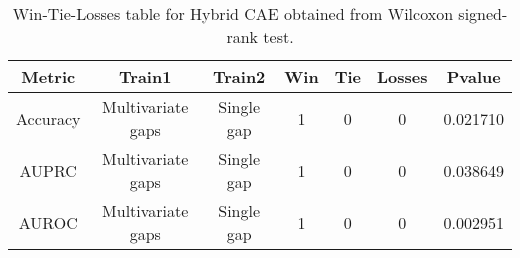 \begin{table}[H]
\centering
\begin{tabular}{|c|c|c|c|c|c|c|}

\textbf{Metric} &    \textbf{Train1} & \textbf{Train2} &  \textbf{Win} &  \textbf{Tie} &  \textbf{Losses} &  \textbf{Pvalue} \\
\hline

       Accuracy &  Multivariate gaps &      Single gap &             1 &             0 &                0 &         0.021710 \\
\hline
          AUPRC &  Multivariate gaps &      Single gap &             1 &             0 &                0 &         0.038649 \\
\hline
          AUROC &  Multivariate gaps &      Single gap &             1 &             0 &                0 &         0.002951 \\
\hline

\end{tabular}
\caption{Win-Tie-Losses table for Hybrid CAE obtained from Wilcoxon signed-rank test.}
\label{tab:hybrid_cae_training_data_comparison}
\end{table}